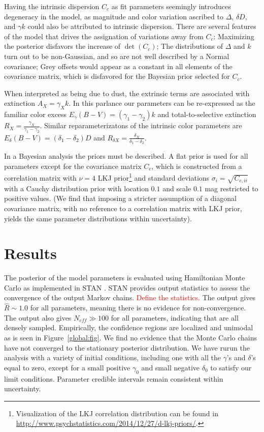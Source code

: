 \documentclass{aastex}   	%
\begin{document}
Having the intrinsic dispersion $C_c$ as fit parameters seemingly introduces degeneracy in the model, as magnitude and color variation
ascribed to $\Delta$, $\delta D$, and $\gamma k$ could also be attributed to intrinsic dispersion.  There are several features of the model
that drives the assignation of variations away from $C_c$:  Maximizing the posterior disfavors the increase of $\det{(C_c)}$;
The distributions of $\Delta$ and $k$ turn out to
be non-Gaussian, and so are not well described by a Normal covariance; Grey offsets would appear as a constant
in all elements of the covariance matrix, which is disfavored for the Bayesian prior selected for $C_c$.

When interpreted as being due to dust, the extrinsic terms are associated with extinction $A_X = \gamma_X k$.  In
this parlance our parameters can be re-expressed as the  familiar color excess
$E_\gamma(B-V) = (\gamma_1-\gamma_2) k$ and total-to-selective extinction $R_X = \frac{\gamma_X}{\gamma_1-\gamma_2}$.
Similar reparameterizatons of the intrinsic color parameters are
$E_\delta(B-V) = (\delta_1-\delta_2) D$ and $R_{\delta X} = \frac{\delta_X}{\delta_1-\delta_2}$.

In a Bayesian analysis the priors must be described.  A flat prior is used for all parameters except
for the covariance matrix $C_c$, which is constructed from a correlation matrix with  $\nu=4$  LKJ prior\footnote{
Visualization of the LKJ correlation distribution can be found in \url{http://www.psychstatistics.com/2014/12/27/d-lkj-priors/}.}
\citep{Lewandowski20091989} and standard
deviations $\sigma_i = \sqrt{C_{c,ii}}$ with a  Cauchy distribution prior with location
 $0.1$ and scale $0.1$ mag restricted to positive values.  (We find that imposing a stricter assumption of a
 diagonal covariance matrix, with no reference to a correlation matrix with LKJ prior, yields the same parameter distributions within
 uncertainty).

\section{Results}
\label{results:sec}
The posterior of the model parameters is evaluated using Hamiltonian Monte Carlo as implemented in
STAN \citep{stan}. STAN provides output statistics to assess
the convergence of the output Markov chains.
\textcolor{red}{
Define the statistics.
}
The output gives $\hat{R} \sim 1.0$ for all parameters, meaning there is no evidence for non-convergence.  The
output also gives  $N_{eff} \gg 100$ for all parameters, indicating that are all densely sampled.
Empirically, the confidence regions are localized and unimodal as is seen in  Figure~\ref{global:fig}.  We find no evidence that
the Monte Carlo chains have not converged to the stationary posterior distribution.
We have rurun the analysis with a variety of initial conditions, including one with all the $\gamma$'s and $\delta$'s equal to zero, except for a small positive 
$\gamma_0$ and small negative $\delta_0$ to satisfy our limit conditions.  Parameter credible intervals
remain consistent within uncertainty.
\end{document}
